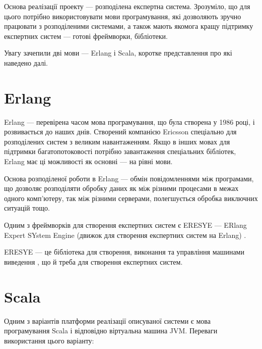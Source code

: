Основа реалізації проекту --- розподілена експертна система.
Зрозуміло, що для цього потрібно використовувати мови програмування,
які дозволяють зручно працювати з розподіленими системами,
а також мають якомога кращу підтримку експертних систем --- готові фреймворки,
бібліотеки.

Увагу зачепили дві мови --- Erlang і Scala, коротке представлення про які
наведено далі.

\section{Erlang}
Erlang --- перевірена часом мова програмування, що була створена у 1986 році,
і розвивається до наших днів.
Створений компанією Ericsson спеціально для розподілених систем з великим
навантаженням.
Якщо в інших мовах для підтримки багатопотоковості потрібно завантаження
спеціальних бібліотек, Erlang має ці можливості як основні --- на рівні мови.

Основа розподіленої роботи в Erlang --- обмін повідомленнями між програмами, що
дозволяє розподіляти обробку даних як між різними процесами в межах одного
комп’ютеру, так між різними серверами, полегшується обробка виключних ситуацій
тощо.

Одним з фреймворків для створення експертних систем є ERESYE --- ERlang Expert
SYstem Engine (движок для створення експертних систем на Erlang) \cite{ERESYE}.

ERESYE --- це бібліотека для створення, виконання та управління машинами
виведення \cite{ErlangES}, що й треба для створення експертних систем.

\section{Scala}
Одним з варіантів платформи реалізації описуваної системи є мова програмування
Scala і відповідно віртуальна машина JVM.
Переваги використання цього варіанту:

